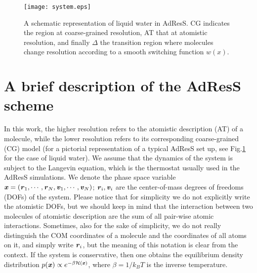 \documentclass[aip,jcp,a4paper,reprint,onecolumn]{revtex4-1}
\newcommand{\bluec}[1]{{\color{blue} #1}}
\newcommand{\vect}[1]{\textbf{\textit{#1}}}
\newcommand{\dd}[1]{\textsf{#1}}
\begin{document}
\begin{figure}
  \centering
  \texttt{[image: system.eps]}
  \caption{A schematic representation of liquid water in AdResS. CG indicates the region at coarse-grained resolution, AT that at atomistic resolution, and finally $\Delta$ the transition region where molecules change resolution according to a smooth switching function $w(x)$.}
  \label{fig:adress-water}
\end{figure}

\section{A brief description of the AdResS scheme}

In this work, the higher resolution refers to the atomistic
description (AT) of a molecule, while the lower resolution refers to
its corresponding coarse-grained (CG) model (for a pictorial representation of a typical AdResS set up, see Fig.\ref{fig:adress-water} for the case of liquid water).
We assume that the dynamics of the
system is subject to the Langevin equation, which is the thermostat
usually used in the AdResS simulations.
We denote the
phase space variable $\vect x = (\vect r_1,\cdots,\vect r_N, \vect v_1,\cdots,\vect v_N)$; $\vect r_i,
\vect v_i$ are the \bluec{center-of-mass}
degrees of freedoms (DOFs) of the system.
\bluec{Please notice that for simplicity we do not explicitly write the
  atomistic DOFs, but we should keep in mind that the interaction
  between two  molecules of atomistic description
  are the sum of all pair-wise atomic interactions.
  Sometimes, also for the sake of simplicity,
  we do not really distinguish the COM coordinates
  of a molecule and the coordinates of all atoms on it, and simply
  write $\vect r_i$, but the meaning of this notation is
  clear from the context.
}
If the
system is conservative, %
then one obtains the equilibrium density distribution $p(\vect
x)\propto e^{-\beta\mathcal H(\vect x)}$, where $\beta = 1/k_BT$ is the inverse temperature.
\end{document}
